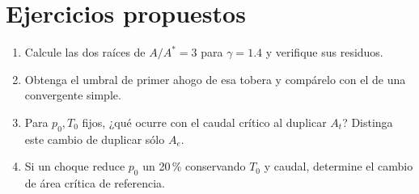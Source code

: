 \section{Ejercicios propuestos}
\begin{enumerate}
\item Calcule las dos raíces de $A/A^*=3$ para $\gamma=1.4$ y verifique sus residuos.
\item Obtenga el umbral de primer ahogo de esa tobera y compárelo con el de una convergente simple.
\item Para $p_0,T_0$ fijos, ¿qué ocurre con el caudal crítico al duplicar $A_t$? Distinga este cambio de duplicar sólo $A_e$.
\item Si un choque reduce $p_0$ un 20\,\% conservando $T_0$ y caudal, determine el cambio de área crítica de referencia.
\end{enumerate}
